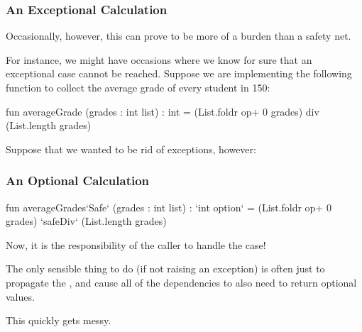 \documentclass[aspectratio=169]{beamer}
\begin{document}
\begin{frame}[fragile]
  \frametitle{An Exceptional Calculation}

  Occasionally, however, this can prove to be more of a burden than a
  safety net.

  \pause
  \vspace{\fill}

  For instance, we might have occasions where we know for sure that
  an exceptional case cannot be reached. Suppose we are implementing
  the following function to collect the average grade of every 
  student in 150:
  
  \pause
  \begin{codeblock}
    fun averageGrade (grades : int list) : int =
      (List.foldr op+ 0 grades)
      div
      (List.length grades)
  \end{codeblock}

  \pause
  \vspace{\fill}

  Suppose that we wanted to be rid of exceptions, however:
\end{frame}

\begin{frame}[fragile]
  \frametitle{An Optional Calculation}

  \begin{codeblock}
    fun averageGrades`Safe` (grades : int list) : `int option` =
      (List.foldr op+ 0 grades)
      `safeDiv`
      (List.length grades)
  \end{codeblock}

  \pause
  \vspace{\fill}

  Now, it is the responsibility of the caller to handle the  case!

  \pause
  \vspace{\fill}

  The only sensible thing to do (if not raising an exception) is often just to
  propagate the , and cause all of the dependencies to also need
  to return optional values. 

  \pause
  \vspace{\fill}

  This quickly gets messy.
\end{frame}
\end{document}

